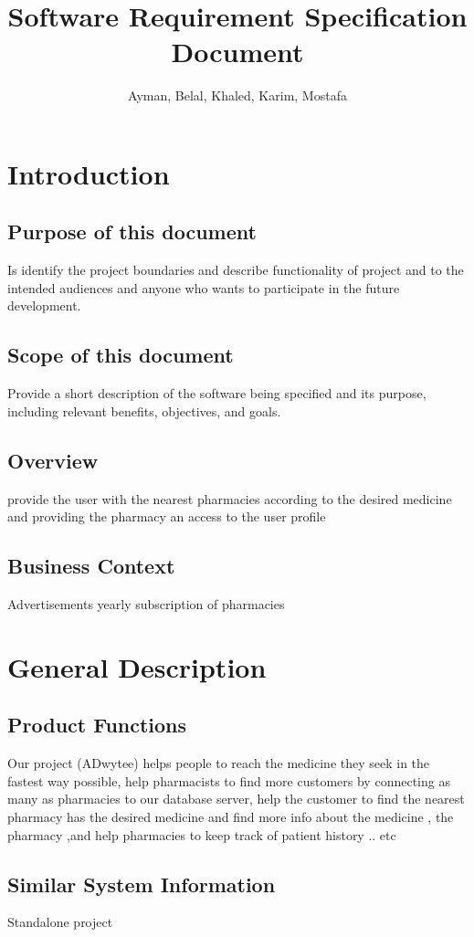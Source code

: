 \documentclass[]{article}
\title{Software Requirement Specification Document}
\author{Ayman, Belal, Khaled, Karim, Mostafa}
\begin{document}
\maketitle

\section{Introduction}
\subsection{Purpose of this document}
Is identify the project boundaries and describe functionality of project and to the intended audiences and anyone who wants to  participate in the future development.
\subsection{ Scope of this document}
Provide a short description of the software being specified and its purpose, including relevant benefits, objectives, and goals.

\subsection{Overview}
provide the user with the nearest pharmacies according to the desired medicine and providing the pharmacy an access to the user profile
\subsection{ Business Context}
Advertisements
\newline
yearly subscription of pharmacies


\section{General Description}
\subsection{Product Functions}
Our project (ADwytee) helps people to reach the medicine they seek in the fastest way possible, help pharmacists to find more customers by connecting as many as pharmacies to our database server, help the customer to find the nearest pharmacy has the desired medicine and find more info about the medicine , the pharmacy ,and help pharmacies to keep track of patient history  .. etc
\subsection{Similar System Information}
Standalone project 
\end{document}
